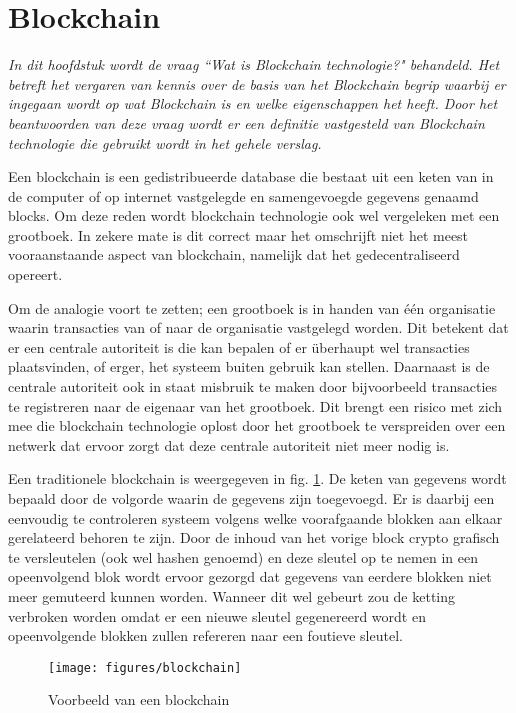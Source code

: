 \section{Blockchain}
\label{chapter:blockchain}

\textit{
  In dit hoofdstuk wordt de vraag  ``Wat is Blockchain technologie?" behandeld. Het betreft het vergaren van kennis over de basis van het Blockchain begrip waarbij er ingegaan wordt op wat Blockchain is en welke eigenschappen het heeft. Door het beantwoorden van deze vraag wordt er een definitie vastgesteld van Blockchain technologie die gebruikt wordt in het gehele verslag.
}

Een blockchain is een gedistribueerde database die bestaat uit een keten van in de computer of op internet vastgelegde en samengevoegde gegevens genaamd blocks. Om deze reden wordt blockchain technologie ook wel vergeleken met een grootboek. In zekere mate is dit correct maar het omschrijft niet het meest vooraanstaande aspect van blockchain, namelijk dat het gedecentraliseerd opereert.

Om de analogie voort te zetten; een grootboek is in handen van één organisatie waarin transacties van of naar de organisatie vastgelegd worden. Dit betekent dat er een centrale autoriteit is die kan bepalen of er überhaupt wel transacties plaatsvinden, of erger, het systeem buiten gebruik kan stellen. Daarnaast is de centrale autoriteit ook in staat misbruik te maken door bijvoorbeeld transacties te registreren naar de eigenaar van het grootboek. Dit brengt een risico met zich mee die blockchain technologie oplost door het grootboek te verspreiden over een netwerk dat ervoor zorgt dat deze centrale autoriteit niet meer nodig is.

Een traditionele blockchain is weergegeven in fig. \ref{blockchain_reference}. De keten van gegevens wordt bepaald door de volgorde waarin de gegevens zijn toegevoegd. Er is daarbij een eenvoudig te controleren systeem volgens welke voorafgaande blokken aan elkaar gerelateerd behoren te zijn. Door de inhoud van het vorige block crypto grafisch te versleutelen (ook wel hashen genoemd) en deze sleutel op te nemen in een opeenvolgend blok wordt ervoor gezorgd dat gegevens van eerdere blokken niet meer gemuteerd kunnen worden. Wanneer dit wel gebeurt zou de ketting verbroken worden omdat er een nieuwe sleutel gegenereerd wordt en opeenvolgende blokken zullen refereren naar een foutieve sleutel.
  
\begin{figure}[h]
  \texttt{[image: figures/blockchain]}
  \caption{Voorbeeld van een blockchain \citep{zheng2016blockchain}}
  \label{blockchain_reference}
\end{figure}

